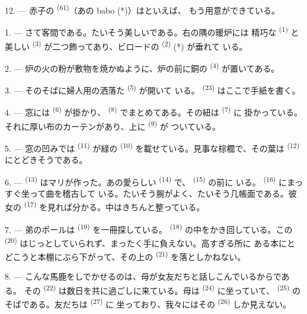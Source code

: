 12. --- 赤子の \textsuperscript{(61)}（あの babo (*)）はといえば、
もう用意ができている。

\VUsaut{5.0mm}
\VUsaut{3.0mm}

1. --- さて客間である。たいそう美しいである。右の隅の暖炉には
精巧な \textsuperscript{(1)} と美しい \textsuperscript{(3)}
が二つ飾ってあり、ビロードの \textsuperscript{(2)} (*) が垂れて
いる。

2. --- 炉の火の粉が敷物を焼かぬように、炉の前に銅の
\textsuperscript{(4)} が置いてある。

3. --- そのそばに婦人用の洒落た \textsuperscript{(5)} が開いて
いる。 \textsuperscript{(23)} はここで手紙を書く。

4. --- 窓には \textsuperscript{(6)} が掛かり、
\textsuperscript{(8)} でまとめてある。その紐は \textsuperscript{(7)} に
掛かっている。それに厚い布のカーテンがあり、上に \textsuperscript{(9)} が
ついている。

5. --- 窓の凹みでは \textsuperscript{(11)} が緑の
\textsuperscript{(10)} を載せている。見事な棕櫚で、その葉は
\textsuperscript{(12)} にとどきそうである。

6. ---  \textsuperscript{(13)} はマリが作った。あの愛らしい
 \textsuperscript{(14)} で、 \textsuperscript{(15)} の前に
いる。 \textsuperscript{(16)} にまっすぐ坐って曲を稽古して
いる。たいそう腕がよく、たいそう几帳面である。彼女の
\textsuperscript{(17)} を見れば分かる。中はきちんと整っている。

\VUsaut{5.0mm}
\VUsaut{3.0mm}

7. --- 弟のポールは \textsuperscript{(19)} を一冊探している。
 \textsuperscript{(18)} の中をかき回している。この
\textsuperscript{(20)} はじっとしていられず、まったく手に負えない。高すぎる所に
ある本にとどこうと本棚にぶら下がって、その上の \textsuperscript{(21)}
を落としかねない。

8. --- こんな馬鹿をしでかせるのは、母が女友だちと話しこんでいるからである。
その \textsuperscript{(22)} は数日を共に過ごしに来ている。母は
 \textsuperscript{(24)} に坐っていて、
\textsuperscript{(25)} のそばである。友だちは \textsuperscript{(27)} に
坐っており、我々にはその \textsuperscript{(26)} しか見えない。

